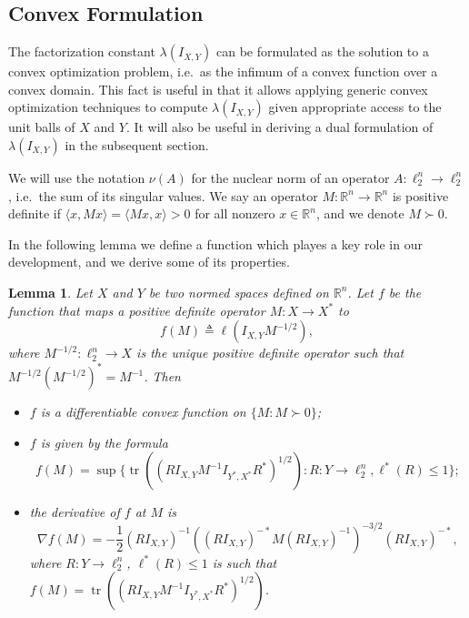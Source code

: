 \documentclass[12pt]{article}
\newtheorem{lemma}{Lemma}
\newcommand{\R}{{\mathbb{R}}}
\newcommand{\eqdef}{\triangleq}
\DeclareMathOperator{\tr}{tr}
\begin{document}
\subsection{Convex Formulation}

The factorization constant $\lambda(I_{X,Y})$ can be formulated as the
solution to a convex optimization problem, i.e.~as the infimum of a
convex function over a convex domain. This fact is useful in that it
allows applying generic convex optimization techniques to compute
$\lambda(I_{X,Y})$ given appropriate access to the unit balls of $X$
and $Y$. It will also be useful in deriving a dual formulation of
$\lambda(I_{X,Y})$ in the subsequent section. 

We will use the notation $\nu(A)$ for the nuclear norm of an operator
$A:\ell_2^n \to \ell_2^n$, i.e.~the sum of its singular values. We say
an operator $M:\R^n \to \R^n$ is positive definite if $\langle x,
Mx\rangle = \langle Mx, x\rangle > 0$ for all nonzero $x \in \R^n$,
and we denote $M \succ 0$.  


In the following lemma we define a
function which playes a key role in our development, and we derive
some of its properties.

\begin{lemma}\label{lm:obj-f}
  Let $X$ and $Y$ be two normed spaces defined on $\R^n$. Let $f$ be
  the function that maps a positive definite operator $M: X \to X^*$
  to
  \[
  f(M) \eqdef  \ell(I_{X,Y}M^{-1/2}),
  \]
  where $M^{-1/2}:\ell_2^n \to X$ is the unique positive definite operator such that
  $M^{-1/2}(M^{-1/2})^* = M^{-1}$. Then
  \begin{itemize}
  \item $f$ is a differentiable convex function on $\{M: M \succ 0\}$;
  \item $f$ is given by the formula
    \begin{equation}\label{eq:f-formula}
    f(M) = \sup\{\tr((RI_{X,Y}M^{-1}I_{Y^*,X^*}R^*)^{1/2}): 
    R: Y \to \ell_2^n, \ell^*(R) \le 1\};
    \end{equation}
  \item the derivative of $f$ at $M$ is 
    \begin{equation}\label{eq:f-derivative}
    \nabla f(M) = 
    -\frac{1}{2} (RI_{X,Y})^{-1} ((RI_{X,Y})^{-*} M (RI_{X,Y})^{-1})^{-3/2} (RI_{X,Y})^{-*},
    \end{equation}
    where $R: Y \to \ell_2^n$, $\ell^*(R) \le 1$ is such that $f(M) = 
    \tr((RI_{X,Y}M^{-1}I_{Y^*,X^*}R^*)^{1/2})$.
  \end{itemize}
\end{lemma}
\end{document}
